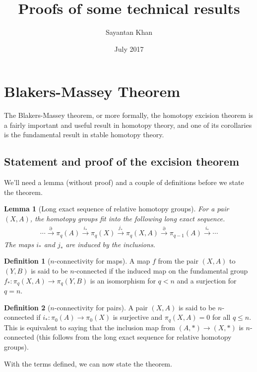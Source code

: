 \documentclass[12pt, notitlepage]{article}
\title{Proofs of some technical results}
\author{Sayantan Khan}
\date{July 2017}
\newtheorem{lem}[thm]{Lemma}
\theoremstyle{definition}
\newtheorem{defn}{Definition}[section]
\begin{document}
\maketitle

\tableofcontents


\newpage

\section{Blakers-Massey Theorem}
\label{sec:blak-mass-theor}

The Blakers-Massey theorem, or more formally, the homotopy excision theorem is a fairly important
and useful result in homotopy theory, and one of its corollaries is the fundamental result in stable
homotopy theory.

\subsection{Statement and proof of the excision theorem}
\label{sec:stat-proof-excis}

We'll need a lemma (without proof) and a couple of definitions before we state the theorem.

\begin{lem}[Long exact sequence of relative homotopy groups]
  For a pair $(X,A)$, the homotopy groups fit into the following long exact sequence.
  \begin{align*}
    \cdots \xrightarrow{\partial} \pi_q(A) \xrightarrow{i_{\ast}} \pi_q(X) \xrightarrow{j_{\ast}}
    \pi_q(X,A) \xrightarrow{\partial} \pi_{q-1}(A) \xrightarrow{i_{\ast}}\cdots
  \end{align*}
  The maps $i_{\ast}$ and $j_{\ast}$ are induced by the inclusions.
\end{lem}

\begin{defn}[$n$-connectivity for maps]
  A map $f$ from the pair $(X,A)$ to $(Y,B)$ is said to be $n$-connected if the induced map on the
  fundamental group $f_{\ast}: \pi_q(X,A) \to \pi_q(Y,B)$ is an isomorphism for $q < n$ and a
  surjection for $q=n$.
\end{defn}

\begin{defn}[$n$-connectivity for pairs]
  A pair $(X,A)$ is said to be $n$-connected if $i_{\ast}: \pi_0(A) \to \pi_0(X)$ is surjective and
  $\pi_q(X,A) = 0$ for all $q \leq n$. This is equivalent to saying that the inclusion map from
  $(A, \ast) \to (X, \ast)$ is $n$-connected (this follows from the long exact sequence for relative
  homotopy groups).
\end{defn}
With the terms defined, we can now state the theorem.
\end{document}
